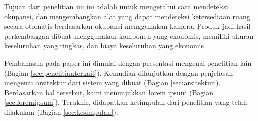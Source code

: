 Tujuan dari penelitian ini ini adalah untuk mengetahui cara mendeteksi okupansi, dan mengembangkan alat yang dapat mendeteksi ketersediaan ruang secara otomatis berdasarkan okupansi menggunakan kamera. Produk jadi hasil perkembangan dibuat menggunakan komponen yang ekonomis, memiliki ukuran keseluruhan yang ringkas, dan  biaya keseluruhan yang ekonomis


Pembahasan pada paper ini dimulai dengan presentasi mengenai penelitian lain (Bagian \ref{sec:penelitianterkait}).
Kemudian dilanjutkan dengan penjelasan mengenai arsitektur dari sistem yang dibuat (Bagian \ref{sec:arsitektur}).
Berdasarkan hal tersebut, kami menunjukkan lorem ipsum (Bagian \ref{sec:loremipsum}).
Terakhir, didapatkan kesimpulan dari penelitian yang telah dilakukan (Bagian \ref{sec:kesimpulan}).
